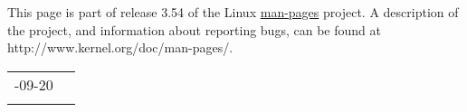 \documentclass[]{article}
\renewcommand{\emph}[1]{\underline{#1}}
\begin{document}

This page is part of release 3.54 of the Linux \emph{man-pages} project.
A description of the project, and information about reporting bugs, can
be found at http://www.kernel.org/doc/man-pages/.

\begin{longtable}[c]{@{}ll@{}}
\toprule\addlinespace
2010-09-20 &
\\\addlinespace
\bottomrule
\end{longtable}
\end{document}
